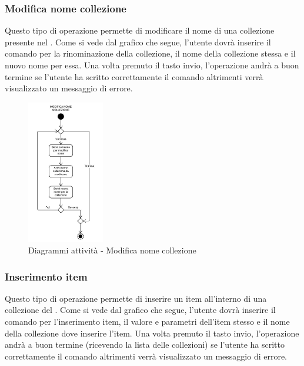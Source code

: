 \documentclass{scalatekids-article}
\begin{document}
\subsubsection{Modifica nome collezione}

Questo tipo di operazione permette di modificare il nome di una collezione
presente nel . Come si vede dal grafico che segue, l'utente dovrà
inserire il comando per la rinominazione della collezione, il nome della
collezione stessa e il nuovo nome per essa. Una volta premuto il tasto invio,
l'operazione andrà a buon termine se l'utente ha scritto correttamente il
comando altrimenti verrà visualizzato un messaggio di errore.

\begin{figure}[H]
  \begin{center}
    \includegraphics[width=0.3\textwidth, keepaspectratio]{img/diagrammiAttivita/modNomeCollezione.jpeg}
    \caption{Diagrammi attività - Modifica nome collezione}
  \end{center}
\end{figure}

\subsubsection{Inserimento item}

Questo tipo di operazione permette di inserire un item all'interno di una
collezione del . Come si vede dal grafico che segue, l'utente dovrà
inserire il comando per l'inserimento item, il valore e parametri dell'item
stesso e il nome della collezione dove inserire l'item. Una volta premuto il
tasto invio, l'operazione andrà a buon termine (ricevendo la lista delle
collezioni) se l'utente ha scritto correttamente il comando altrimenti verrà
visualizzato un messaggio di errore.
\end{document}
